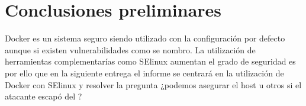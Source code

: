 \documentclass[letter,10pt]{article}
\begin{document}
\section{Conclusiones preliminares}
Docker es un sistema seguro siendo utilizado con la configuración por defecto aunque si existen vulnerabilidades como se nombro. La utilización de herramientas complementarías como SElinux aumentan el grado de seguridad es por ello que en la siguiente entrega el informe se centrará en la utilización de Docker con SElinux y resolver la pregunta ¿podemos asegurar el host u otros \containers si el atacante escapó del \container?




\end{document}
